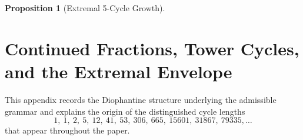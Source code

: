 \documentclass[12pt, oneside]{article}
\numberwithin{equation}{section}
\theoremstyle{definition}
\newtheorem{proposition}{Proposition}[section]
\theoremstyle{plain}
\theoremstyle{remark}
\begin{document}
\begin{proposition}[Extremal 5-Cycle Growth]
\newpage
\section{Continued Fractions, Tower Cycles, and the Extremal Envelope}
\label{app:continued-fractions}

This appendix records the Diophantine structure underlying the admissible
grammar and explains the origin of the distinguished cycle lengths
\[
1,\ 1,\ 2,\ 5,\ 12,\ 41,\ 53,\ 306,\ 665,\ 15601,\ 31867,\ 79335,\ldots
\]
that appear throughout the paper.








\end{proposition}
\end{document}
